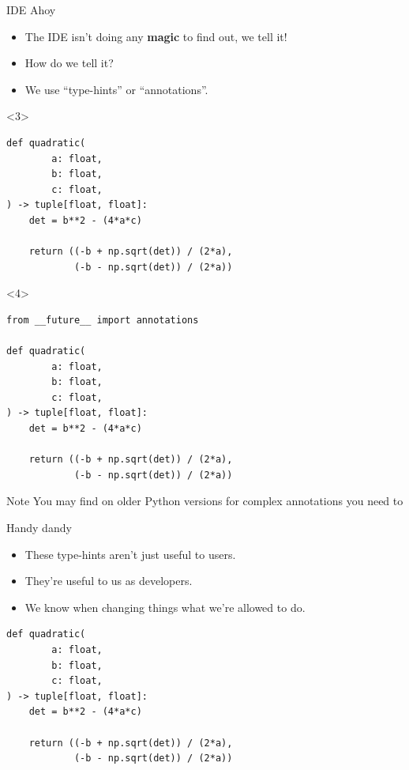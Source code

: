 \documentclass[usenames,dvipsnames]{beamer}
\newcommand{\cmd}[1]{\texttt{\detokenize{#1}}}
\newcommand{\kw}[1]{\texttt{\detokenize{#1}}}
\begin{document}
\begin{frame}[fragile]{IDE Ahoy}
    \begin{itemize}[<+->]
        \item{}The IDE isn't doing any \textbf{magic} to find out, we tell it!
        \item{}How do we tell it?
        \item{}We use ``type-hints'' or ``annotations''.
    \end{itemize}

    \begin{onlyenv}<3>
        \begin{lstlisting}[basicstyle=\scriptsize]
def quadratic(
        a: float, 
        b: float, 
        c: float,
) -> tuple[float, float]:
    det = b**2 - (4*a*c)

    return ((-b + np.sqrt(det)) / (2*a),
            (-b - np.sqrt(det)) / (2*a))
        \end{lstlisting}
    \end{onlyenv}

    \begin{onlyenv}<4>
        \begin{lstlisting}[basicstyle=\scriptsize]
from __future__ import annotations
        
def quadratic(
        a: float, 
        b: float, 
        c: float,
) -> tuple[float, float]:
    det = b**2 - (4*a*c)

    return ((-b + np.sqrt(det)) / (2*a),
            (-b - np.sqrt(det)) / (2*a))
        \end{lstlisting}

        \begin{block}{Note}
            You may find on older Python versions for complex annotations you need to \cmd{import} \kw{annotations}
        \end{block}
    \end{onlyenv}
\end{frame}

\begin{frame}[fragile]{Handy dandy}
    \begin{itemize}[<+->]
        \item{}These type-hints aren't just useful to users.
        \item{}They're useful to us as developers.
        \item{}We know when changing things what we're allowed to do.
    \end{itemize}

    \begin{lstlisting}[basicstyle=\scriptsize]
def quadratic(
        a: float, 
        b: float, 
        c: float,
) -> tuple[float, float]:
    det = b**2 - (4*a*c)

    return ((-b + np.sqrt(det)) / (2*a),
            (-b - np.sqrt(det)) / (2*a))
    \end{lstlisting}

\end{frame}
\end{document}
